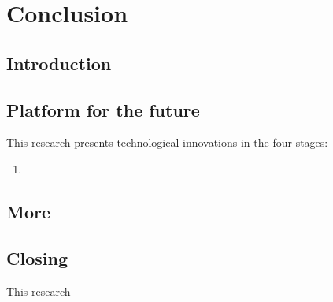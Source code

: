 
\chapter*{Conclusion}\label{chap:CC}
\setcounter{chapter}{6}

\setcounter{section}{-1}
\section{Introduction}

\section{Platform for the future}

This research presents technological innovations in the four stages:
\begin{enumerate}
	\item 
\end{enumerate}

\section{More}


\section{Closing}
This research 



	